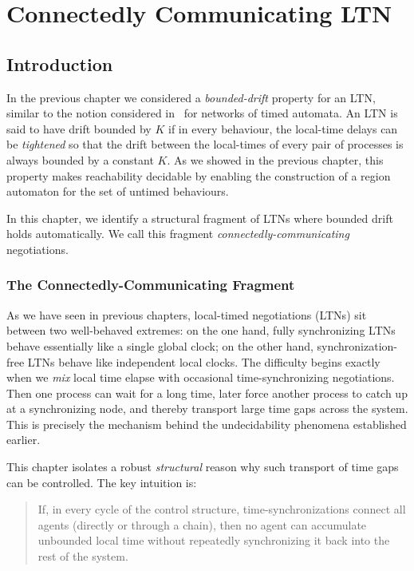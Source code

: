 \chapter{Connectedly Communicating LTN}

\section{Introduction}

In the previous chapter we considered a \emph{bounded-drift} property for an LTN, similar to the notion considered in~\cite{DBLP:conf/concur/HerbreteauSW22} for networks of timed automata. An LTN is said to have drift bounded by $K$ if in every behaviour, the local-time delays can be \emph{tightened} so that the drift between the local-times of every pair of processes is always bounded by a constant $K$. As we showed in the previous chapter, this property makes reachability decidable by enabling the construction of a region automaton for the set of untimed behaviours.

In this chapter, we identify a structural fragment of LTNs where bounded drift holds automatically. We call this fragment \emph{connectedly-communicating} negotiations.

\subsection{The Connectedly-Communicating Fragment}

As we have seen in previous chapters, local-timed negotiations (LTNs) sit between two well-behaved extremes: on the one hand, fully synchronizing LTNs behave essentially like a single global clock; on the other hand, synchronization-free LTNs behave like independent local clocks. The difficulty begins exactly when we \emph{mix} local time elapse with occasional time-synchronizing negotiations. Then one process can wait for a long time, later force another process to catch up at a synchronizing node, and thereby transport large time gaps across the system. This is precisely the mechanism behind the undecidability phenomena established earlier.

This chapter isolates a robust \emph{structural} reason why such transport of time gaps can be controlled. The key intuition is:
\begin{quote}
If, in every cycle of the control structure, time-synchronizations connect all agents (directly or through a chain), then no agent can accumulate unbounded local time without repeatedly synchronizing it back into the rest of the system.
\end{quote}

